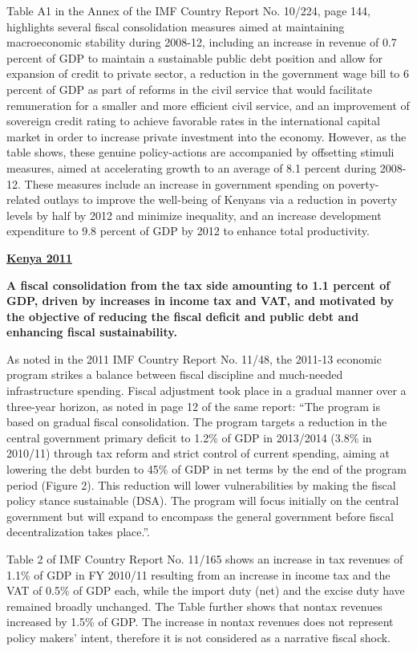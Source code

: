 Table A1 in the Annex of the IMF Country Report No. 10/224, page 144, highlights several fiscal consolidation measures aimed at maintaining macroeconomic stability during 2008-12, including an increase in revenue of 0.7 percent of GDP to maintain a sustainable public debt position and allow for expansion of credit to private sector, a reduction in the government wage bill to 6 percent of GDP as part of reforms in the civil service that would facilitate remuneration for a smaller and more efficient civil service, and an improvement of sovereign credit rating to achieve favorable rates in the international capital market in order to increase private investment into the economy. However, as the table shows, these genuine policy-actions are accompanied by offsetting stimuli measures, aimed at accelerating growth to an average of 8.1 percent during 2008-12. These measures include an increase in government spending on poverty-related outlays to improve the well-being of Kenyans via a reduction in poverty levels by half by 2012 and minimize inequality, and an increase development expenditure to 9.8 percent of GDP by 2012 to enhance total productivity.

\textbf{\underline{Kenya 2011}}

\textbf{A fiscal consolidation from the tax side amounting to 1.1 percent of GDP, driven by increases in income tax and VAT, and motivated by the objective of reducing the fiscal deficit and public debt and enhancing fiscal sustainability.}

As noted in the 2011 IMF Country Report No. 11/48, the 2011-13 economic program strikes a balance between fiscal discipline and much-needed infrastructure spending. Fiscal adjustment took place in a gradual manner over a three-year horizon, as noted in page 12 of the same report: “The program is based on gradual fiscal consolidation. The program targets a reduction in the central government primary deficit to 1.2\% of GDP in 2013/2014 (3.8\% in 2010/11) through tax reform and strict control of current spending, aiming at lowering the debt burden to 45\% of GDP in net terms by the end of the program period (Figure 2). This reduction will lower vulnerabilities by making the fiscal policy stance sustainable (DSA). The program will focus initially on the central government but will expand to encompass the general government before fiscal decentralization takes place.”.

Table 2 of IMF Country Report No. 11/165 shows an increase in tax revenues of 1.1\% of GDP in FY 2010/11 resulting from an increase in income tax and the VAT of 0.5\% of GDP each, while the import duty (net) and the excise duty have remained broadly unchanged. The Table further shows that nontax revenues increased by 1.5\% of GDP. The increase in nontax revenues does not represent policy makers’ intent, therefore it is not considered as a narrative fiscal shock.

